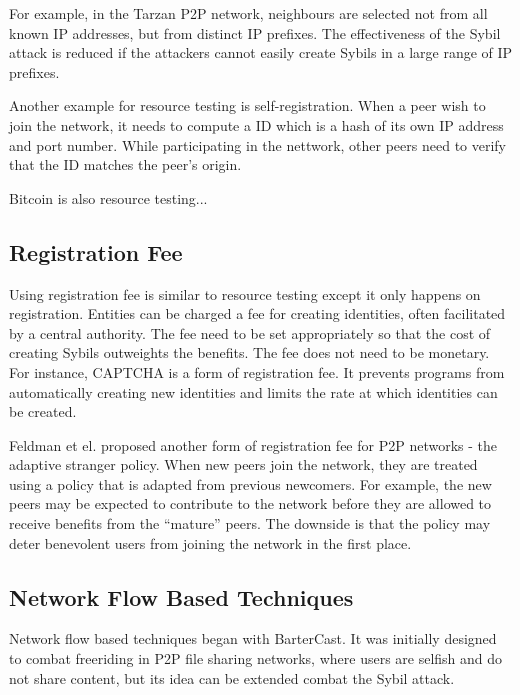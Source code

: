 For example, in the Tarzan P2P network, neighbours are selected not from all
known IP addresses, but from distinct IP prefixes\cite{freedman2002tarzan}. The
effectiveness of the Sybil attack is reduced if the attackers cannot easily
create Sybils in a large range of IP prefixes.

Another example for resource
testing is self-registration\cite{dinger2006defending}. When a peer wish to join
the network, it needs to compute a ID which is a hash of its own IP address and
port number. While participating in the nettwork, other peers need to verify
that the ID matches the peer's origin.

Bitcoin is also resource testing...

\subsection{Registration Fee}
Using registration fee is similar to resource testing except it only happens on
registration. Entities can be charged a fee for creating identities, often 
facilitated by a central authority. The fee need to be set appropriately so that
the cost of creating Sybils outweights the benefits. The fee does not need to be
monetary. For instance, CAPTCHA\cite{von2003captcha} is a form of
registration fee. It prevents programs from automatically creating new
identities and limits the rate at which identities can be created.

Feldman et el. proposed another form of registration fee for P2P networks - the
adaptive stranger policy\cite{feldman2004robust}. When new peers join the
network, they are treated using a policy that is adapted from previous
newcomers. For example, the new peers may be expected to contribute to the
network before they are allowed to receive benefits from the ``mature'' peers.
The downside is that the policy may deter benevolent users from joining the network
in the first place.


\subsection{Network Flow Based Techniques}
Network flow based techniques began with
BarterCast\cite{meulpolder2009bartercast}. It was initially designed to combat
freeriding in P2P file sharing networks, where users are selfish and do not
share content, but its idea can be extended combat the Sybil attack. 

